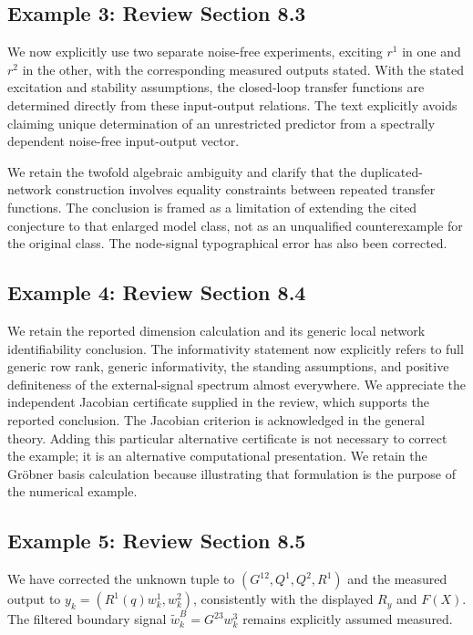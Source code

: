 \documentclass[11pt]{article}
\begin{document}
\subsection*{Example 3: Review Section 8.3}
We now explicitly use two separate noise-free experiments, exciting $r^1$ in
one and $r^2$ in the other, with the corresponding measured outputs stated.
With the stated excitation and stability assumptions, the closed-loop transfer
functions are determined directly from these input-output relations. The text
explicitly avoids claiming unique determination of an unrestricted predictor
from a spectrally dependent noise-free input-output vector.

We retain the twofold algebraic ambiguity and clarify that the duplicated-network
construction involves equality constraints between repeated transfer functions.
The conclusion is framed as a limitation of extending the cited conjecture to
that enlarged model class, not as an unqualified counterexample for the original
class. The node-signal typographical error has also been corrected.

\subsection*{Example 4: Review Section 8.4}
We retain the reported dimension calculation and its generic local network
identifiability conclusion. The informativity statement now explicitly refers
to full generic row rank, generic informativity, the standing assumptions, and
positive definiteness of the external-signal spectrum almost everywhere.
We appreciate the independent Jacobian certificate supplied in the review,
which supports the reported conclusion. The Jacobian criterion is acknowledged
in the general theory. Adding this particular alternative certificate is not
necessary to correct the example; it is an alternative computational
presentation. We retain the Gr\"obner basis calculation because illustrating
that formulation is the purpose of the numerical example.

\subsection*{Example 5: Review Section 8.5}
We have corrected the unknown tuple to $(G^{12},Q^1,Q^2,R^1)$ and the measured
output to $y_k=(R^1(q)w_k^1,w_k^2)$, consistently with the displayed $R_y$ and
$F(X)$. The filtered boundary signal $\tilde w_k^B=G^{23}w_k^3$ remains explicitly
assumed measured.
\end{document}
